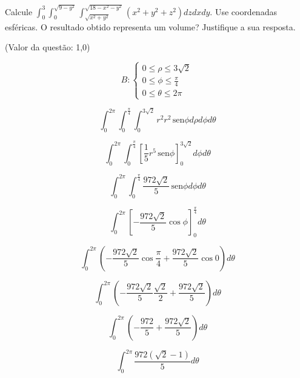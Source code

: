 \documentclass[10pt,a4paper]{article}
\newcommand{\sen}{\hspace{2pt}\textrm{sen}}
\begin{document}
	Calcule $ \int_{0}^3 \int_{0}^{\sqrt{9-y^2}} \int_{\sqrt{x^2+y^2}}^{\sqrt{18-x^2-y^2}} (x^2 + y^2 + z^2) dz dx dy $. Use coordenadas esféricas. O resultado obtido representa um volume? Justifique a sua resposta.
	
	(Valor da questão: 1,0)
	
	\begin{equation}
		B:
		\begin{cases}
		0 \le \rho \le 3\sqrt{2}\\
		0 \le \phi \le \frac{\pi}{4}\\
		0 \le \theta \le 2\pi
		\end{cases}
	\end{equation}
	
	\begin{equation*}
		\int_{0}^{2\pi} \int_{0}^{\frac{\pi}{4}} \int_{0}^{3\sqrt{2}} r^2 r^2 \sen \phi d\rho d\phi d\theta
	\end{equation*}
	
	\begin{equation*}
		\int_{0}^{2\pi} \int_{0}^{\frac{\pi}{4}} \left[ \frac{1}{5}r^5 \sen \phi \right]_{0}^{3\sqrt{2}} d\phi d\theta
	\end{equation*}
	
	\begin{equation*}
		\int_{0}^{2\pi} \int_{0}^{\frac{\pi}{4}} \frac{972\sqrt{2}}{5} \sen \phi d\phi d\theta
	\end{equation*}
	
	\begin{equation*}
		\int_{0}^{2\pi} \left[-\frac{972\sqrt{2}}{5} \cos \phi \right]_{0}^{\frac{\pi}{4}} d\theta
	\end{equation*}
	
	\begin{equation*}
		\int_{0}^{2\pi} \left(-\frac{972\sqrt{2}}{5} \cos \frac{\pi}{4} + \frac{972\sqrt{2}}{5} \cos 0 \right) d\theta
	\end{equation*}
	
	\begin{equation*}
		\int_{0}^{2\pi} \left(-\frac{972\sqrt{2}}{5} \frac{\sqrt{2}}{2} + \frac{972\sqrt{2}}{5} \right) d\theta
	\end{equation*}
	
	\begin{equation*}
		\int_{0}^{2\pi} \left(-\frac{972}{5} + \frac{972\sqrt{2}}{5} \right) d\theta
	\end{equation*}
	
	\begin{equation*}
		\int_{0}^{2\pi} \frac{972(\sqrt{2} - 1)}{5} d\theta
	\end{equation*}
	
\end{document}
